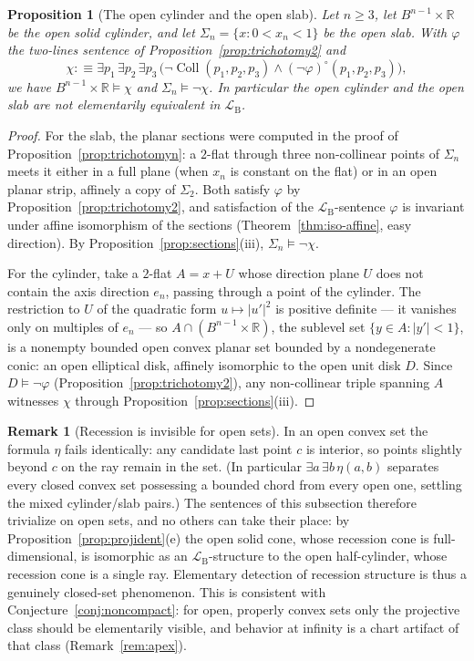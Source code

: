 \documentclass[11pt]{amsart}
\newtheorem{proposition}[theorem]{Proposition}
\theoremstyle{definition}
\newtheorem{remark}[theorem]{Remark}
\newcommand{\R}{\mathbb{R}}
\newcommand{\LB}{\mathcal{L}_{\mathrm{B}}}
\newcommand{\Coll}{\operatorname{Coll}}
\begin{document}
\begin{proposition}[The open cylinder and the open slab]\label{prop:cyl-slab-open}
Let $n\ge3$, let $B^{n-1}\times\R$ be the open solid cylinder, and let
$\Sigma_n=\{x:0<x_n<1\}$ be the open slab. With $\varphi$ the two-lines
sentence of Proposition~\ref{prop:trichotomy2} and
\[
\chi:\equiv\exists p_1\,\exists p_2\,\exists p_3\,
\bigl(\neg\Coll(p_1,p_2,p_3)\wedge(\neg\varphi)^{\circ}(p_1,p_2,p_3)\bigr),
\]
we have $B^{n-1}\times\R\models\chi$ and $\Sigma_n\models\neg\chi$. In
particular the open cylinder and the open slab are not elementarily
equivalent in $\LB$.
\end{proposition}

\begin{proof}
For the slab, the planar sections were computed in the proof of
Proposition~\ref{prop:trichotomyn}: a $2$-flat through three non-collinear
points of $\Sigma_n$ meets it either in a full plane (when $x_n$ is constant
on the flat) or in an open planar strip, affinely a copy of $\Sigma_2$. Both
satisfy $\varphi$ by Proposition~\ref{prop:trichotomy2}, and satisfaction of
the $\LB$-sentence $\varphi$ is invariant under affine isomorphism of the
sections (Theorem~\ref{thm:iso-affine}, easy direction). By
Proposition~\ref{prop:sections}(iii), $\Sigma_n\models\neg\chi$.

For the cylinder, take a $2$-flat $A=x+U$ whose direction plane $U$ does not
contain the axis direction $e_n$, passing through a point of the cylinder.
The restriction to $U$ of the quadratic form $u\mapsto|u'|^2$ is positive
definite --- it vanishes only on multiples of $e_n$ --- so
$A\cap(B^{n-1}\times\R)$, the sublevel set $\{y\in A:|y'|<1\}$, is a nonempty
bounded open convex planar set bounded by a nondegenerate conic: an open
elliptical disk, affinely isomorphic to the open unit disk $D$. Since
$D\models\neg\varphi$ (Proposition~\ref{prop:trichotomy2}), any
non-collinear triple spanning $A$ witnesses $\chi$ through
Proposition~\ref{prop:sections}(iii).
\end{proof}

\begin{remark}[Recession is invisible for open sets]\label{rem:open-recession}
In an open convex set the formula $\eta$ fails identically: any candidate
last point $c$ is interior, so points slightly beyond $c$ on the ray remain
in the set. (In particular $\exists a\,\exists b\,\eta(a,b)$ separates every
closed convex set possessing a bounded chord from every open one, settling
the mixed cylinder/slab pairs.) The sentences of this subsection therefore
trivialize on open sets, and no others can take their place: by
Proposition~\ref{prop:projident}(e) the open solid cone, whose recession
cone is full-dimensional, is isomorphic as an $\LB$-structure to the open
half-cylinder, whose recession cone is a single ray. Elementary detection of
recession structure is thus a genuinely closed-set phenomenon. This is
consistent with Conjecture~\ref{conj:noncompact}: for open, properly convex
sets only the projective class should be elementarily visible, and behavior
at infinity is a chart artifact of that class (Remark~\ref{rem:apex}).
\end{remark}
\end{document}
